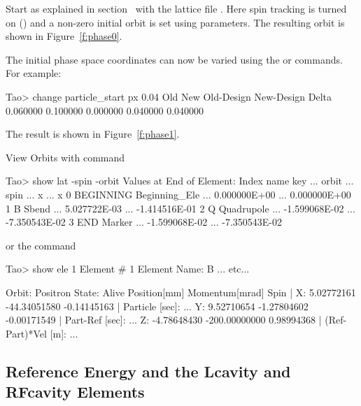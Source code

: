 \documentclass{hitec}     %
\begin{document}
Start \tao as explained in section~ with the lattice file . Here
spin tracking is turned on () and a non-zero initial orbit is set
using  parameters. The resulting orbit is shown in Figure~\ref{f:phase0}.

The initial phase space coordinates can now be varied using the  or 
commands. For example:
\begin{code}
Tao> change particle_start px 0.04
           Old           New    Old-Design    New-Design         Delta
      0.060000      0.100000      0.000000      0.040000      0.040000  
\end{code}

The result is shown in Figure~\ref{f:phase1}. 

View Orbits with  command

\begin{code}
Tao> show lat -spin -orbit
      Values at End of Element:
 Index  name      key           ...           orbit  ...          spin 
                                ...               x  ...             x 
     0  BEGINNING Beginning_Ele ...    0.000000E+00  ...  0.000000E+00 
     1  B         Sbend         ...    5.027722E-03  ... -1.414516E-01 
     2  Q         Quadrupole    ...   -1.599068E-02  ... -7.350543E-02 
     3  END       Marker        ...   -1.599068E-02  ... -7.350543E-02 
\end{code}

or the  command

\begin{code}
Tao> show ele 1
 Element #                1
 Element Name: B
... etc...

Orbit:  Positron   State: Alive
         Position[mm] Momentum[mrad]        Spin   |
  X:       5.02772161   -44.34051580  -0.14145163  | Particle [sec]:     ...
  Y:       9.52710654    -1.27804602  -0.00171549  | Part-Ref [sec]:     ...
  Z:      -4.78648430  -200.00000000   0.98994368  | (Ref-Part)*Vel [m]: ...
\end{code}

\subsection{Reference Energy and the Lcavity and RFcavity Elements}
\label{s:ref.energy}
\end{document}
